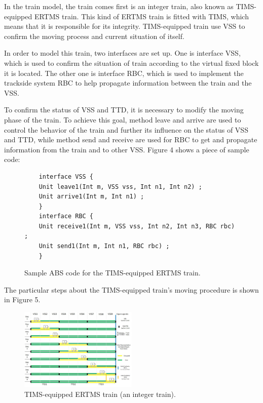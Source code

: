 \documentclass[article,dr=phil,type=drfinal,colorback,accentcolor=tud9c]{tudthesis}
\begin{document}
  In the train model, the train comes first is an integer train, also known as TIMS-equipped ERTMS train. This kind of ERTMS train is fitted with TIMS, which means that it is responsible for its integrity. TIMS-equipped train use VSS to confirm the moving process and current situation of itself.
  
  In order to model this train, two interfaces are set up. One is interface VSS, which is used to confirm the situation of train according to the virtual fixed block it is located. The other one is interface RBC, which is used to implement the trackside system RBC to help propagate information between the train and the VSS.
  
  To confirm the status of VSS and TTD, it is necessary to modify the moving phase of the train. To achieve this goal, method leave and arrive are used to control the behavior of the train and further its influence on the status of VSS and TTD, while method send and receive are used for RBC to get and propagate information from the train and to other VSS. Figure 4 shows a piece of sample code:
  
  \begin{figure}[H]
  	\begin{lstlisting}
  	interface VSS {
  	Unit leave1(Int m, VSS vss, Int n1, Int n2) ;
  	Unit arrive1(Int m, Int n1) ;
  	}  	
  	interface RBC {
  	Unit receive1(Int m, VSS vss, Int n2, Int n3, RBC rbc) ;
  	Unit send1(Int m, Int n1, RBC rbc) ;
  	}\end{lstlisting}
  	\caption[Caption for LOF]{Sample ABS code for the TIMS-equipped ERTMS train.}
  \end{figure}
  
  The particular steps about the TIMS-equipped train's moving procedure is shown in Figure 5.
    
  \begin{figure}[H]
  	 \begin{center}
  	 	\includegraphics[width=0.5\textwidth]{train1}
  	 	\caption[Caption for LOF]{TIMS-equipped ERTMS train (an integer train).}
  	 \end{center}
  \end{figure}
\end{document}
